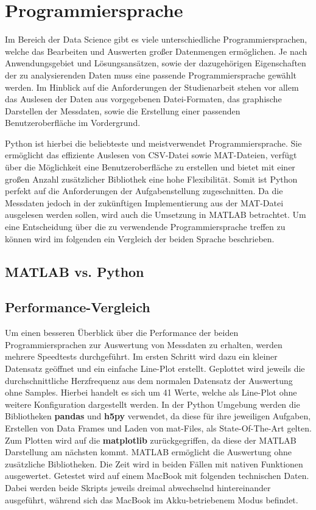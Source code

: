 \section{Programmiersprache}

Im Bereich der Data Science gibt es viele unterschiedliche Programmiersprachen, welche das Bearbeiten und Auswerten großer Datenmengen ermöglichen. Je nach Anwendungsgebiet und Lösungsansätzen, sowie der dazugehörigen Eigenschaften der zu analysierenden Daten muss eine passende Programmiersprache gewählt werden. Im Hinblick auf die Anforderungen der Studienarbeit stehen vor allem das Auslesen der Daten aus vorgegebenen Datei-Formaten, das graphische Darstellen der Messdaten, sowie die Erstellung einer passenden Benutzeroberfläche im Vordergrund. 

Python ist hierbei die beliebteste und meistverwendet Programmiersprache. Sie ermöglicht das effiziente Auslesen von CSV-Datei sowie MAT-Dateien, verfügt über die Möglichkeit eine Benutzeroberfläche zu erstellen und bietet mit einer großen Anzahl zusätzlicher Bibliothek eine hohe Flexibilität. Somit ist Python perfekt auf die Anforderungen der Aufgabenstellung zugeschnitten. Da die Messdaten jedoch in der zukünftigen Implementierung aus der MAT-Datei ausgelesen werden sollen, wird auch die Umsetzung in MATLAB betrachtet. Um eine Entscheidung über die zu verwendende Programmiersprache treffen zu können wird im folgenden ein Vergleich der beiden Sprache beschrieben.

\subsection{MATLAB vs. Python}



\subsection{Performance-Vergleich}

Um einen besseren Überblick über die Performance der beiden Programmiersprachen zur Auswertung von Messdaten zu erhalten, werden mehrere Speedtests durchgeführt. Im ersten Schritt wird dazu ein kleiner Datensatz geöffnet und ein einfache Line-Plot erstellt. Geplottet wird jeweils die durchschnittliche Herzfrequenz aus dem normalen Datensatz der Auswertung ohne Samples. Hierbei handelt es sich um 41 Werte, welche als Line-Plot ohne weitere Konfiguration dargestellt werden. In der Python Umgebung werden die Bibliotheken \textbf{pandas} und \textbf{h5py} verwendet, da diese für ihre jeweiligen Aufgaben, Erstellen von Data Frames und Laden von mat-Files, als State-Of-The-Art gelten. Zum Plotten wird auf die \textbf{matplotlib} zurückgegriffen, da diese der MATLAB Darstellung am nächsten kommt. MATLAB ermöglicht die Auswertung ohne zusätzliche Bibliotheken. Die Zeit wird in beiden Fällen mit nativen Funktionen ausgewertet. Getestet wird auf einem MacBook mit folgenden technischen Daten. Dabei werden beide Skripts jeweils dreimal abwechselnd hintereinander ausgeführt, während sich das MacBook im Akku-betriebenem Modus befindet.

